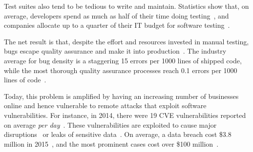 %
Test suites also tend to be tedious to write and maintain.  Statistics show that, on average, developers spend as much as half of their time doing testing~\cite{codeComplete}, and companies allocate up to a quarter of their IT budget for software testing~\cite{capgemini-world-quality}.

The net result is that, despite the effort and resources invested in manual testing, bugs escape quality assurance and make it into production~\cite{redHatSecurityX}.
%
The industry average for bug density is a staggering 15 errors per 1000 lines of shipped code, while the most thorough quality assurance processes reach 0.1 errors per 1000 lines of code~\cite{codeComplete}.

Today, this problem is amplified by having an increasing number of businesses online and hence vulnerable to remote attacks that exploit software vulnerabilities.  For instance, in 2014, there were 19 CVE vulnerabilities reported on average \emph{per day}~\cite{nvd}.
%
These vulnerabilities are exploited to cause major disruptions~\cite{sony-hack} or leaks of sensitive data~\cite{sony-hack,psp-hack}.  On average, a data breach cost \$3.8 million in 2015~\cite{breach2015}, and the most prominent cases cost over \$100 million~\cite{target-hack}.




